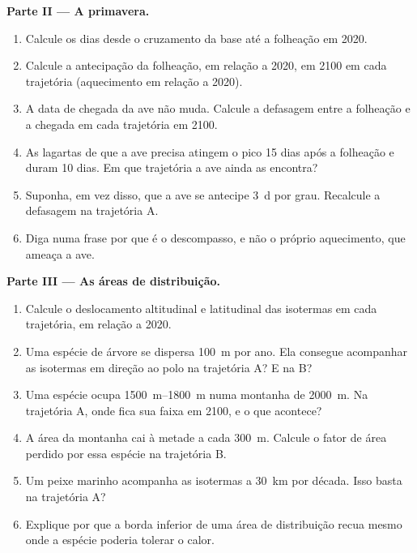 \begin{problem}
\medskip
\noindent\textbf{Parte II --- A primavera.}
\begin{enumerate}[resume]
  \item Calcule os dias desde o cruzamento da base até a folheação em 2020.
  \item Calcule a antecipação da folheação, em relação a 2020, em 2100
        em cada trajetória (aquecimento em relação a 2020).
  \item A data de chegada da ave não muda. Calcule a defasagem
        entre a folheação e a chegada em cada trajetória em 2100.
  \item As lagartas de que a ave precisa atingem o pico 15 dias após a
        folheação e duram 10 dias. Em que trajetória a ave ainda as
        encontra?
  \item Suponha, em vez disso, que a ave se antecipe \qty{3}{d} por
        grau. Recalcule a defasagem na trajetória A.
  \item Diga numa frase por que é o descompasso, e não o próprio
        aquecimento, que ameaça a ave.
\end{enumerate}

\medskip
\noindent\textbf{Parte III --- As áreas de distribuição.}
\begin{enumerate}[resume]
  \item Calcule o deslocamento altitudinal e latitudinal das
        isotermas em cada trajetória, em relação a 2020.
  \item Uma espécie de árvore se dispersa \qty{100}{m} por ano. Ela
        consegue acompanhar as isotermas em direção ao polo na
        trajetória A? E na B?
  \item Uma espécie ocupa \qtyrange{1500}{1800}{m} numa montanha de
        \qty{2000}{m}. Na trajetória A, onde fica sua faixa
        em 2100, e o que acontece?
  \item A área da montanha cai à metade a cada \qty{300}{m}. Calcule o
        fator de área perdido por essa espécie na trajetória B.
  \item Um peixe marinho acompanha as isotermas a \qty{30}{km} por década.
        Isso basta na trajetória A?
  \item Explique por que a borda inferior de uma área de distribuição
        recua mesmo onde a espécie poderia tolerar o calor.
\end{enumerate}


\end{problem}
